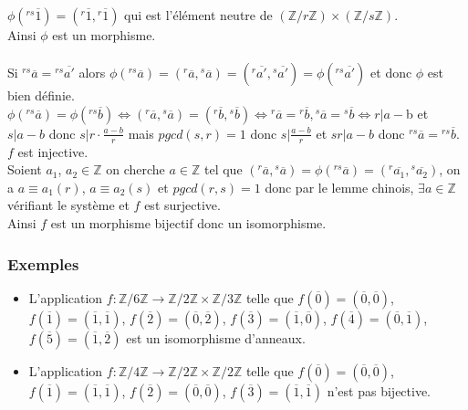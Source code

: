 \documentclass[a4paper,10pt]{book} %
\newcommand{\Z}{\mathbb{Z}}
\begin{document}
$\phi({}^{rs}\overline{1})=({}^{r}\overline{1},{}^{r}\overline{1})$ qui est l'élément neutre de $(\Z/r\Z)\times (\Z/s\Z)$.\\

Ainsi $\phi$ est un morphisme.\\\\
Si ${}^{rs}\overline{a}={}^{rs}\overline{a'}$ alors $\phi({}^{rs}\overline{a})=({}^{r}\overline{a},{}^{s}\overline{a})=({}^{r}\overline{a'},{}^{s}\overline{a'})=\phi({}^{rs}\overline{a'})$ et donc $\phi$ est bien définie.\\

$\phi({}^{rs}\overline{a})=\phi({}^{rs}\overline{b}) \Leftrightarrow ({}^{r}\overline{a},{}^{s}\overline{a})=({}^{r}\overline{b},{}^{s}\overline{b})\Leftrightarrow {}^{r}\overline{a}= {}^{r}\overline{b},{}^{s}\overline{a}= {}^{s}\overline{b}\Leftrightarrow r|a-$b et $s|a-b$ donc $s|r\cdot \frac{a-b}{r}$ mais $pgcd(s,r)=1$ donc $s|\frac{a-b}{r}$ et $sr|a-b$ donc ${}^{rs}\overline{a}={}^{rs}\overline{b}$. $f$ est injective.\\

Soient $a_1$, $a_2\in\Z$ on cherche $a\in\Z$ tel que $({}^{r}\overline{a},{}^{s}\overline{a})=\phi({}^{rs}\overline{a})=({}^{r}\overline{a_1},{}^{s}\overline{a_2})$, on a $a\equiv a_1(r)$, $a\equiv a_2(s)$ et  $pgcd(r,s)=1$ donc par le lemme chinois, $\exists a\in \Z$ vérifiant le système et $f$ est surjective.\\

Ainsi $f$ est un morphisme bijectif donc un isomorphisme.

\subsubsection{Exemples}
\begin{itemize}
\item L'application $f: \Z/6\Z \rightarrow \Z/2\Z \times \Z/3\Z$ telle que 
$f(\overline{0})=(\overline{0},\overline{0})$,
$f(\overline{1})=(\overline{1},\overline{1})$,
$f(\overline{2})=(\overline{0},\overline{2})$,
$f(\overline{3})=(\overline{1},\overline{0})$,
$f(\overline{4})=(\overline{0},\overline{1})$,
$f(\overline{5})=(\overline{1},\overline{2})$
est un isomorphisme d'anneaux.\\

\item L'application $f: \Z/4\Z \rightarrow \Z/2\Z \times \Z/2\Z$ telle que 
$f(\overline{0})=(\overline{0},\overline{0})$,
$f(\overline{1})=(\overline{1},\overline{1})$,
$f(\overline{2})=(\overline{0},\overline{0})$,
$f(\overline{3})=(\overline{1},\overline{1})$
n'est pas bijective.
\end{itemize}
\end{document}
